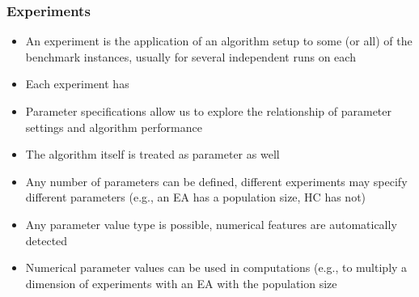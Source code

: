 \begin{frame}[t]%
\frametitle{Experiments}%
\begin{itemize}%
\item An experiment is the application of an algorithm setup to some (or all) of the benchmark instances, usually for several independent runs on each%
\item<2-> Each experiment has%
%
%
\item<10-> Parameter specifications allow us to explore the relationship of parameter settings and algorithm performance%
\item<10-> The algorithm itself is treated as parameter as well%
\item<11-> Any number of parameters can be defined, different experiments may specify different parameters (e.g., an EA has a population size, HC has not)%
\item<12-> Any parameter value type is possible, numerical features are automatically detected%
\item<13-> Numerical parameter values can be used in computations (e.g., to multiply a  dimension of experiments with an EA with the population size%
%
\end{itemize}%
\end{frame}%
%
%
